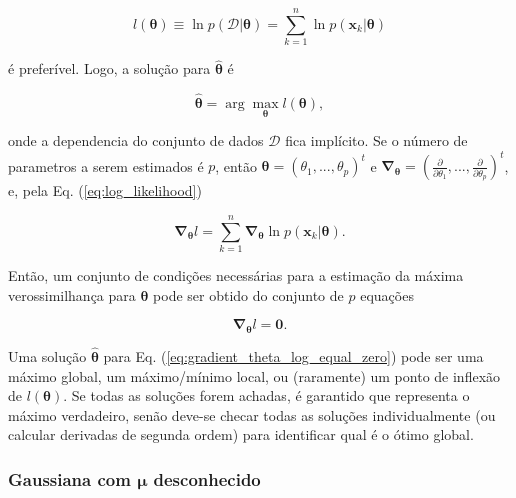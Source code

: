 \documentclass[a4paper,12pt,twocolumn]{article}
\newcommand{\equationref}[1]{Eq. (\ref{eq:#1})}
\begin{document}
\begin{equation}
    l(\boldsymbol{\theta}) \equiv \ln p(\mathcal{D}|\boldsymbol{\theta}) = \sum_{k=1}^{n} \ln p(\boldsymbol{x}_k|\boldsymbol{\theta})
    \label{eq:log_likelihood}
\end{equation}

\noindent é preferível. Logo, a solução para $\boldsymbol{\hat{\theta}}$ é

\begin{equation}
    \boldsymbol{\hat{\theta}} = \arg\max_{\boldsymbol{\theta}} l(\boldsymbol{\theta}),
    \label{eq:hat_theta}
\end{equation}

\noindent onde a dependencia do conjunto de dados $\mathcal{D}$ fica implícito. Se o número de parametros a serem estimados é $p$, então $\boldsymbol{\theta} = (\theta_1, ..., \theta_p)^t$ e $\boldsymbol{\nabla}_{\boldsymbol{\theta}} = (\frac{\partial}{\partial \theta_1}, ..., \frac{\partial}{\partial \theta_p})^t$, e, pela \equationref{log_likelihood}

\begin{equation}
    \boldsymbol{\nabla}_{\boldsymbol{\theta}} l = \sum_{k=1}^{n} \boldsymbol{\nabla}_{\boldsymbol{\theta}} \ln p(\boldsymbol{x}_k|\boldsymbol{\theta}).
    \label{eq:gradient_theta_log}
\end{equation}

Então, um conjunto de condições necessárias para a estimação da máxima verossimilhança para $\boldsymbol{\theta}$ pode ser obtido do conjunto de $p$ equações

\begin{equation}
    \boldsymbol{\nabla}_{\boldsymbol{\theta}} l = \boldsymbol{0}.
    \label{eq:gradient_theta_log_equal_zero}
\end{equation}

Uma solução $\boldsymbol{\hat{\theta}}$ para \equationref{gradient_theta_log_equal_zero} pode ser uma máximo global, um máximo/mínimo local, ou (raramente) um ponto de inflexão de $l(\boldsymbol{\theta})$. Se todas as soluções forem achadas, é garantido que representa o máximo verdadeiro, senão deve-se checar todas as soluções individualmente (ou calcular derivadas de segunda ordem) para identificar qual é o ótimo global.

\subsubsection*{Gaussiana com $\boldsymbol{\mu}$ desconhecido}
\end{document}
